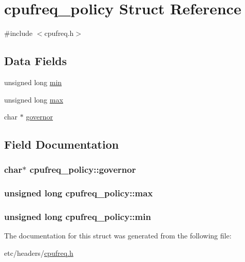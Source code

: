 \hypertarget{structcpufreq__policy}{}\section{cpufreq\+\_\+policy Struct Reference}
\label{structcpufreq__policy}


{\ttfamily \#include $<$cpufreq.\+h$>$}

\subsection*{Data Fields}
\begin{DoxyCompactItemize}
\item 
unsigned long \hyperlink{structcpufreq__policy_a6783e162cb40a7c3dca705d577aa181f}{min}
\item 
unsigned long \hyperlink{structcpufreq__policy_afd7b9c99438bd8dcd9db13bf7a9263f8}{max}
\item 
char $\ast$ \hyperlink{structcpufreq__policy_aa14cc20406ee900a6bd06efe9827ef14}{governor}
\end{DoxyCompactItemize}


\subsection{Field Documentation}
\subsubsection[{\texorpdfstring{governor}{governor}}]{\setlength{\rightskip}{0pt plus 5cm}char$\ast$ cpufreq\+\_\+policy\+::governor}\hypertarget{structcpufreq__policy_aa14cc20406ee900a6bd06efe9827ef14}{}\label{structcpufreq__policy_aa14cc20406ee900a6bd06efe9827ef14}
\subsubsection[{\texorpdfstring{max}{max}}]{\setlength{\rightskip}{0pt plus 5cm}unsigned long cpufreq\+\_\+policy\+::max}\hypertarget{structcpufreq__policy_afd7b9c99438bd8dcd9db13bf7a9263f8}{}\label{structcpufreq__policy_afd7b9c99438bd8dcd9db13bf7a9263f8}
\subsubsection[{\texorpdfstring{min}{min}}]{\setlength{\rightskip}{0pt plus 5cm}unsigned long cpufreq\+\_\+policy\+::min}\hypertarget{structcpufreq__policy_a6783e162cb40a7c3dca705d577aa181f}{}\label{structcpufreq__policy_a6783e162cb40a7c3dca705d577aa181f}


The documentation for this struct was generated from the following file\+:\begin{DoxyCompactItemize}
\item 
etc/headers/\hyperlink{cpufreq_8h}{cpufreq.\+h}\end{DoxyCompactItemize}
